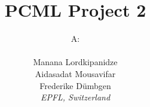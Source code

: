 \documentclass[10pt,conference,compsocconf]{IEEEtran}
\begin{document}
\title{PCML Project 2}

\author{
  A: \\
   \\
  Manana Lordkipanidze \\
  Aidasadat Mousavifar \\
  Frederike Dümbgen \\
  \textit{EPFL, Switzerland}
}

\maketitle



% 
% 
% 



\end{document}
